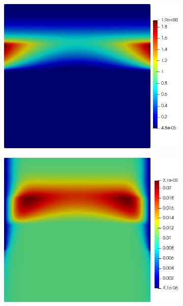 \documentclass[11pt]{article}
\numberwithin{equation}{section}
\begin{document}
 \begin{figure}[h]
     \centering
     \begin{subfigure}[t]{0.31\textwidth}\centering
     \includegraphics[width=\textwidth]{Figures/testpics/BasicDMA.png}
     \caption{}
     \label{fig:baseorig_DMA}
     \end{subfigure}
     \begin{subfigure}[t]{0.31\textwidth}\centering
     \includegraphics[width=\textwidth]{Figures/testpics/BasicZn.png}

\end{subfigure}
\end{figure}
\end{document}
